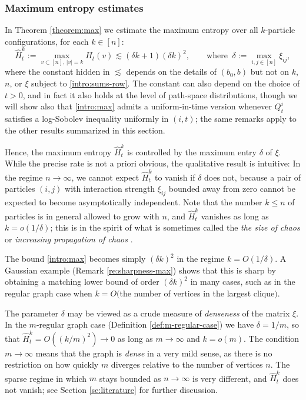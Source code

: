 \documentclass[11pt,reqno]{amsart}
\numberwithin{equation}{section}
\theoremstyle{definition}
\begin{document}
\subsubsection{Maximum entropy estimates} 
In Theorem \ref{theorem:max} we estimate the maximum entropy over all $k$-particle configurations, for each $k \in [n]$:
\begin{equation}
\widehat{H}^k_t :=\max_{v \subset [n], \ |v|=k} H_t(v) \lesssim   (\delta k + 1)(\delta k)^2, \qquad \text{where } \ \delta := \max_{i,j \in [n]}\xi_{ij}, \label{intro:max}
\end{equation}
where the constant hidden in $\lesssim$ depends on the details of $(b_0,b)$ but not on $k$, $n$, or $\xi$ subject to \eqref{intro:sums-row}.  The constant can also depend on the choice of $t > 0$, and in fact it also holds at the level of path-space distributions, though  we will show also that \eqref{intro:max} admits a uniform-in-time version whenever $Q^i_t$ satisfies a log-Sobolev inequality uniformly in $(i,t)$; the same remarks apply to the other results summarized in this section.


Hence,  the maximum entropy $\widehat{H}^k_t$ is controlled by the maximum entry $\delta$ of $\xi$. While the precise rate is not a priori obvious, the qualitative result is intuitive: In the regime $n\to\infty$, we cannot expect $\widehat{H}^k_t$ to vanish if $\delta$ does not, because a pair of particles $(i,j)$ with interaction strength $\xi_{ij}$ bounded away from zero cannot be expected to become asymptotically independent. Note that the number $k\le n$ of particles is in general allowed to grow with $n$, and $\widehat{H}^k_t$ vanishes as long as $k = o(1/\delta)$; this is in the spirit of what is sometimes called the \emph{the size of chaos} or \emph{increasing propagation of chaos} \cite{arous1999increasing}.  

The bound \eqref{intro:max} becomes simply $(\delta k)^2$ in the regime  $k=O(1/\delta)$. A Gaussian example (Remark \ref{re:sharpness-max}) shows that this is sharp by obtaining a matching lower bound of order $(\delta k)^2$ in many cases, such as in the regular graph case when $k=O($the number of vertices in the largest clique$)$.

The parameter $\delta$ may be viewed as a crude measure of \emph{denseness} of the matrix $\xi$. In the $m$-regular graph case (Definition \ref{def:m-regular-case}) we have $\delta=1/m$, so that $\widehat{H}^k_t =O((k/m)^2) \to 0$ as long as $m\to\infty$ and $k=o(m)$. The condition $m\to\infty$ means that the graph is \emph{dense} in a very mild sense, as there is no restriction on how quickly $m$ diverges relative to the number of vertices $n$. The sparse regime in which $m$ stays bounded as $n\to\infty$ is very different, and $\widehat{H}^k_t$ does not vanish; see Section \ref{se:literature} for further discussion.
\end{document}
